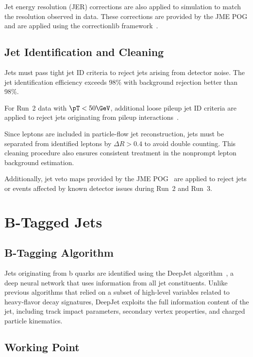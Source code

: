 Jet energy resolution (JER) corrections are also applied to simulation to match the resolution observed in data. These corrections are provided by the JME POG and are applied using the correctionlib framework~\cite{JERCRecommendation}.

\subsection{Jet Identification and Cleaning}

Jets must pass tight jet ID criteria to reject jets arising from detector noise. The jet identification efficiency exceeds 98\% with background rejection better than 98\%.

For Run~2 data with $\pT < 50\GeV$, additional loose pileup jet ID criteria are applied to reject jets originating from pileup interactions~\cite{PileupJetID}.

Since leptons are included in particle-flow jet reconstruction, jets must be separated from identified leptons by $\Delta R > 0.4$ to avoid double counting. This cleaning procedure also ensures consistent treatment in the nonprompt lepton background estimation.

Additionally, jet veto maps provided by the JME POG~\cite{JetVetoMap} are applied to reject jets or events affected by known detector issues during Run~2 and Run~3.

\section{B-Tagged Jets}
\label{sec:btag}

\subsection{B-Tagging Algorithm}

Jets originating from b quarks are identified using the DeepJet algorithm~\cite{Bols:2020bkb}, a deep neural network that uses information from all jet constituents. Unlike previous algorithms that relied on a subset of high-level variables related to heavy-flavor decay signatures, DeepJet exploits the full information content of the jet, including track impact parameters, secondary vertex properties, and charged particle kinematics.

\subsection{Working Point}

